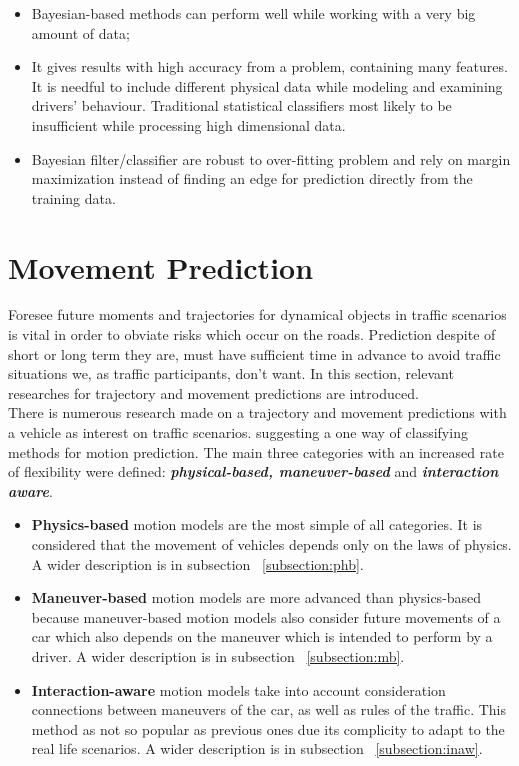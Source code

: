 \begin{itemize}
	\item Bayesian-based methods can perform well while working with a very big amount of data;
	\item It gives results with high accuracy from a problem, containing many features. It is needful to include different physical data while modeling and examining drivers’ behaviour. Traditional statistical classifiers most likely to be insufficient while processing high dimensional data.
	\item Bayesian filter/classifier are robust to over-fitting problem and rely on margin maximization instead of finding an edge for prediction directly from the training data.
\end{itemize}


\section{Movement Prediction}

Foresee future moments and trajectories for dynamical objects in traffic scenarios is vital in order to obviate risks which occur on the roads. Prediction despite of short or long term they are, must have sufficient time in advance to avoid traffic situations we, as traffic participants, don't want. In this section, relevant researches for trajectory and movement predictions are introduced. \\
There is numerous research made on a trajectory and movement predictions with a vehicle as interest on traffic scenarios. \cite{ClassificationI} suggesting a one way of classifying methods for motion prediction. The main three categories with an increased rate of flexibility were defined: \textbf{\textit{physical-based, maneuver-based}} and \textbf{\textit{interaction aware}}.

\begin{itemize}
	\item \textbf{Physics-based} motion models are the most simple of all categories. It is considered that the movement of vehicles depends only on the laws of physics. A wider description is in subsection ~\ref{subsection:phb}.
	\item \textbf{Maneuver-based} motion models are more advanced than physics-based because maneuver-based motion models also consider future movements of a car which also depends on the maneuver which is intended to perform by a driver. A wider description is in subsection ~\ref{subsection:mb}.
	\item \textbf{Interaction-aware} motion models take into account consideration connections between maneuvers of the car, as well as rules of the traffic. This method as not so popular as previous ones due its complicity to adapt to the real life scenarios. A wider description is in subsection ~\ref{subsection:inaw}.
\end{itemize}

